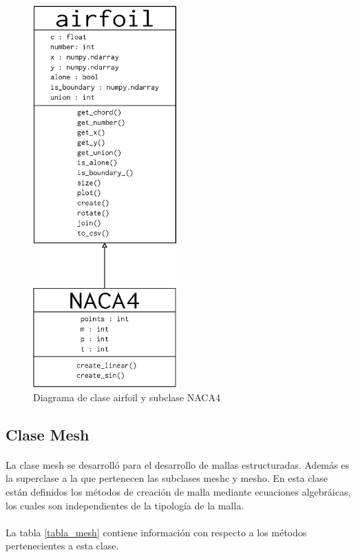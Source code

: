 \documentclass[letterpaper, openright, 12pt]{book}
\begin{document}
    \begin{figure}[htbp!]
        \centering
        \includegraphics[width=55mm]{./Imagenes/airfoil_class}
        \caption[Diagrama de clase airfoil y subclase NACA4]{Diagrama de clase airfoil y subclase
        NACA4}
        \label{airfoil_class}
    \end{figure}


    \subsection{Clase Mesh}
    \paragraph*{}
        La clase mesh se desarrolló para el desarrollo de mallas estructuradas.
        Además es la superclase a la que pertenecen las subclases
        mesh\textunderscore c y mesh\textunderscore o. En esta clase están
        definidos los métodos de creación de malla mediante ecuaciones
        algebráicas, los cuales son independientes de la tipología de la malla.

    \paragraph*{}
        La tabla \ref{tabla_mesh} contiene información con respecto a los
        métodos pertenecientes a esta clase.
\end{document}
